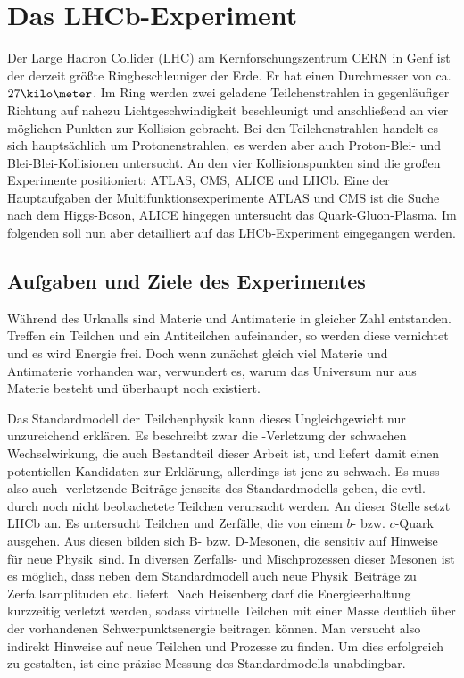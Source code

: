 \chapter{Das LHCb-Experiment}  \label{kap:experiment}
Der Large Hadron Collider (LHC) am Kernforschungszentrum CERN in Genf ist der derzeit größte Ringbeschleuniger der Erde. Er hat einen Durchmesser von ca. $27\kilo\meter$. Im Ring werden zwei geladene Teilchenstrahlen in gegenläufiger Richtung auf nahezu Lichtgeschwindigkeit beschleunigt und anschließend an vier möglichen Punkten zur Kollision gebracht. Bei den Teilchenstrahlen handelt es sich hauptsächlich um Protonenstrahlen, es werden aber auch Proton-Blei- und Blei-Blei-Kollisionen untersucht. An den vier Kollisionspunkten sind die großen Experimente positioniert: ATLAS, CMS, ALICE und LHCb. Eine der Hauptaufgaben der Multifunktionsexperimente ATLAS und CMS ist die Suche nach dem Higgs-Boson, ALICE hingegen untersucht das Quark-Gluon-Plasma. Im folgenden soll nun aber detailliert auf das LHCb-Experiment eingegangen werden. \cite{lhc-info}

\section{Aufgaben und Ziele des Experimentes}
Während des Urknalls sind Materie und Antimaterie in gleicher Zahl entstanden. Treffen ein Teilchen und ein Antiteilchen aufeinander, so werden diese vernichtet und es wird Energie frei. Doch wenn zunächst gleich viel Materie und Antimaterie vorhanden war, verwundert es, warum das Universum nur aus Materie besteht und überhaupt noch existiert.

Das Standardmodell der Teilchenphysik kann dieses Ungleichgewicht nur unzureichend erklären. Es beschreibt zwar die \CP-Verletzung der schwachen Wechselwirkung, die auch Bestandteil dieser Arbeit ist, und liefert damit einen potentiellen Kandidaten zur Erklärung, allerdings ist jene zu schwach. Es muss also auch \CP-verletzende Beiträge jenseits des Standardmodells geben, die evtl. durch noch nicht beobachetete Teilchen verursacht werden. An dieser Stelle setzt LHCb an. Es untersucht Teilchen und Zerfälle, die von einem $b$- bzw. $c$-Quark ausgehen. Aus diesen bilden sich B- bzw. D-Mesonen, die sensitiv auf Hinweise für \glqq neue Physik\grqq\ sind. In diversen Zerfalls- und Mischprozessen dieser Mesonen ist es möglich, dass neben dem Standardmodell auch \glqq neue Physik\grqq\ Beiträge zu Zerfallsamplituden etc. liefert. Nach Heisenberg darf die Energieerhaltung kurzzeitig verletzt werden, sodass virtuelle Teilchen mit einer Masse deutlich über der vorhandenen Schwerpunktsenergie beitragen können. Man versucht also indirekt Hinweise auf neue Teilchen und Prozesse zu finden. Um dies erfolgreich zu gestalten, ist eine präzise Messung des Standardmodells unabdingbar. \cite{cern-courier, roadmap, lhcb-info}

